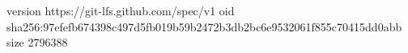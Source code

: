 version https://git-lfs.github.com/spec/v1
oid sha256:97efefb674398c497d5fb019b59b2472b3db2bc6e9532061f855c70415dd0abb
size 2796388
